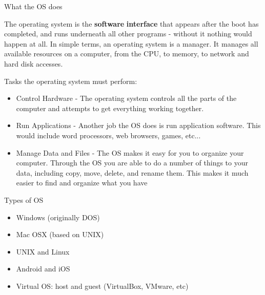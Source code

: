 \documentclass[english,aspectratio=169]{beamer}
\begin{document}
\begin{frame}{What the OS does}

{\small{}The operating system is the }\textbf{\small{}software}{\small{}
}\textbf{\small{}interface}{\small{} that appears after the boot has completed, and runs underneath all other programs - without it nothing would happen at all. In simple terms, an operating system is a manager.
It manages all available resources on a computer, from the CPU, to memory, to network and hard disk accesses.}{\small\par}

{\small{}Tasks the operating system must perform:}{\small\par}
\begin{itemize}
\item {\small{}Control Hardware - The operating system controls all the
parts of the computer and attempts to get everything working together. }{\small\par}
\item {\small{}Run Applications - Another job the OS does is run application software. This would include word processors, web browsers, games,
etc... }{\small\par}
\item {\small{}Manage Data and Files - The OS makes it easy for you to organize your computer. Through the OS you are able to do a number of things to your data, including copy, move, delete, and rename them. This makes it much easier to find and organize what you have}{\small\par}
\end{itemize}
\end{frame}

\begin{frame}{Types of OS}
\begin{itemize}
\item Windows (originally DOS)
\item Mac OSX (based on UNIX)
\item UNIX and Linux
\item Android and iOS
\item Virtual OS: host and guest (VirtualBox, VMware, etc)
\end{itemize}
\end{frame}
\end{document}
